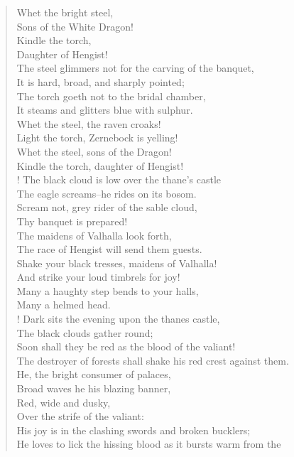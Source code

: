 \begin{verse}
Whet the bright steel,\\
Sons of the White Dragon!\\
Kindle the torch,\\
Daughter of Hengist!\\
The steel glimmers not for the carving of the banquet,\\
It is hard, broad, and sharply pointed;\\
The torch goeth not to the bridal chamber,\\
It steams and glitters blue with sulphur.\\
Whet the steel, the raven croaks!\\
Light the torch, Zernebock is yelling!\\
Whet the steel, sons of the Dragon!\\
Kindle the torch, daughter of Hengist! \\!
The black cloud is low over the thane's castle\\
The eagle screams--he rides on its bosom.\\
Scream not, grey rider of the sable cloud,\\
Thy banquet is prepared!\\
The maidens of Valhalla look forth,\\
The race of Hengist will send them guests.\\
Shake your black tresses, maidens of Valhalla!\\
And strike your loud timbrels for joy!\\
Many a haughty step bends to your halls,\\
Many a helmed head.\\!
Dark sits the evening upon the thanes castle,\\
The black clouds gather round;\\
Soon shall they be red as the blood of the valiant!\\
The destroyer of forests shall shake his red crest against
them.\\
He, the bright consumer of palaces,\\
Broad waves he his blazing banner,\\
Red, wide and dusky,\\
Over the strife of the valiant:\\
His joy is in the clashing swords and broken bucklers;\\
He loves to lick the hissing blood as it bursts warm from the

\end{verse}
